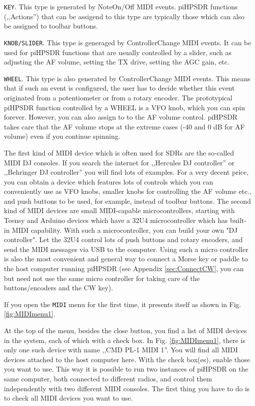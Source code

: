 \documentclass[12pt]{book}
\def\rett#1{\texttt{\color{red}#1}}
\def\bltt#1{\texttt{\color{blue}#1}}
\begin{document}
\rett{KEY}. This type is generated by NoteOn/Off MIDI events. piHPSDR functions (,,Actions'') that
can be assigend to this type are typically those which can also be assigned to toolbar
buttons.

\rett{KNOB/SLIDER}. This type is generaged by ControllerChange MIDI events. It can be used
for piHPSDR functions that are usually controlled by a slider, such as adjusting the AF
volume, setting the TX drive, setting the AGC gain, etc.

\rett{WHEEL}. This type is also generated by ControllerChange MIDI events. This means
that if such an event is configured, the user has to decide whether this event 
originated from a potentiometer or from a rotary encoder. The prototypical piHPSDR
function controlled by a WHEEL is a VFO knob, which you can spin forever. However,
you can also assign to to the AF volume control. piHPSDR takes care that the
AF volume stops at the extreme cases (-40 and 0 dB for AF volume) even if you continue
spinning.

The first kind of MIDI device which is often used for SDRs are the so-called MIDI DJ
consoles. If you search the internet for ,,Hercules DJ controller'' or ,,Behringer
DJ controller'' you will find lots of examples. For a very decent price, you
can obtain a device which features lots of controls which you can conveniently use
as VFO knobs, smaller knobs for controlling the AF volume etc., and push buttons
to be used, for example, instead of toolbar buttons. The second kind of MIDI devices
are small MIDI-capable microcontrollers, starting with Teensy and Arduino devices
which have a 32U4 microcontroller which has built-in MIDI capability. With such a
microcontroller, you can build your own "DJ controller". Let the 32U4 control
lots of push buttons and rotary encoders, and send the MIDI messages via USB to the
computer. Using such a micro controller is also the most convenient and general way
to connect a Morse key or paddle to the host computer running piHPSDR (see
Appendix \ref{sec:ConnectCW}, you can but need not use the same micro controller
for taking care of the buttons/encoders and the CW key).

If you open the \bltt{MIDI} menu for the first time, it presents itself as shown
in Fig. \ref{fig:MIDImenu1}.



At the top of the menu, besides the close button, you find a list of MIDI devices
in the system, each of which with a check box. In Fig. \ref{fig:MIDImenu1}, there is only
one such device with name ,,CMD PL-1 MIDI 1''. You will find all MIDI devices attached
to the host computer here. With the check box(es), enable those you want to use.
This way it is possible to run two instances of piHPSDR on the same computer, both
connected to different radios, and control them independently with two different MIDI
consoles. The first thing you have to do is to check all MIDI devices you want to use.
\end{document}
